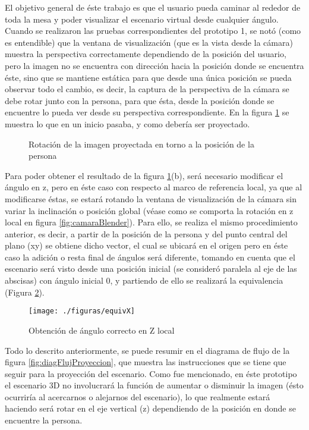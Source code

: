 \documentclass[a4paper,openright,12pt]{report}
\begin{document}
El objetivo general de éste trabajo es que el usuario pueda caminar al rededor de toda la mesa y poder visualizar el escenario virtual desde cualquier ángulo. Cuando se realizaron las pruebas correspondientes del prototipo 1, se notó (como es entendible) que la ventana de visualización (que es la vista desde la cámara) muestra la perspectiva correctamente dependiendo de la posición del usuario, pero la imagen no se encuentra con dirección hacia la posición donde se encuentra éste, sino que se mantiene estática para que desde una única posición se pueda observar todo el cambio, es decir, la captura de la perspectiva de la cámara se debe rotar junto con la persona, para que ésta, desde la posición donde se encuentre lo pueda ver desde su perspectiva correspondiente. En la figura \ref{fig:vistas} se muestra lo que en un inicio pasaba, y como debería ser proyectado.\\
\begin{figure}[thb]
	\centering
	\hspace*{1cm}
	\caption{Rotación de la imagen proyectada en torno a la posición de la persona} \label{fig:vistas}
\end{figure}
Para poder obtener el resultado de la figura \ref{fig:vistas}(b), será necesario modificar el ángulo en z, pero en éste caso con respecto al marco de referencia local, ya que al modificarse éstas, se estará rotando la ventana de visualización de la cámara sin variar la inclinación o posición global (véase como se comporta la rotación en z local en figura \ref{fig:camaraBlender}). Para ello, se realiza el mismo procedimiento anterior, es decir, a partir de la posición de la persona y del punto central del plano (xy) se obtiene dicho vector, el cual se ubicará en el origen pero en éste caso la adición o resta final de ángulos será diferente, tomando en cuenta que el escenario será visto desde una posición inicial (se consideró paralela al eje de las abscisas) con ángulo inicial 0, y partiendo de ello se realizará la equivalencia (Figura \ref{fig:equivX}).
\begin{figure}[H]
	\centering
	\texttt{[image: ./figuras/equivX]}
	\caption{Obtención de ángulo correcto en Z local} \label{fig:equivX}
\end{figure}
Todo lo descrito anteriormente, se puede resumir en el diagrama de flujo de la figura \ref{fig:diagFlujProyeccion}, que muestra las instrucciones que se tiene que seguir para la proyección del escenario. Como fue mencionado, en éste prototipo el escenario 3D no involucrará la función de aumentar o disminuir la imagen (ésto ocurriría al acercarnos o alejarnos del escenario), lo que realmente estará haciendo será rotar en el eje vertical (z) dependiendo de la posición en donde se encuentre la persona.\\
\end{document}
